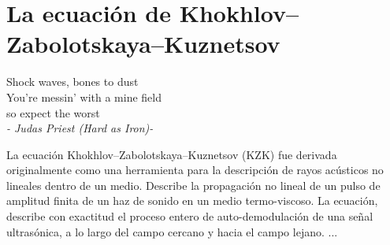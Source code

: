 \chapter{La ecuación de Khokhlov–Zabolotskaya–Kuznetsov}\label{chapter.kzk}
\begin{flushright}
Shock waves, bones to dust\\
You're messin' with a mine field\\
so expect the worst\\
\emph{- Judas Priest (Hard as Iron)-}
\end{flushright}

La ecuación Khokhlov–Zabolotskaya–Kuznetsov (KZK) fue derivada originalmente como una herramienta para la descripción de rayos acústicos no lineales dentro de un medio. Describe la propagación no lineal de un pulso de amplitud finita de un haz de sonido en un medio termo-viscoso. La ecuación, describe con exactitud el proceso entero de auto-demodulación de una señal ultrasónica, a lo largo del campo cercano y hacia el campo lejano. ...
